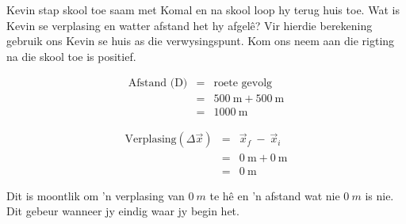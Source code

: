 Kevin stap skool toe saam met Komal en na skool loop hy terug huis toe. Wat is Kevin se verplasing en watter afstand het hy afgel\^e? Vir hierdie berekening gebruik ons Kevin se huis as die verwysingspunt. Kom ons neem aan die rigting na die skool toe is positief.\\
\begin{minipage}{0.5\textwidth}
\begin{eqnarray*}
\text{Afstand (D)} &=& \text{roete~gevolg}\\
&=&500\ \text{m} + 500\ \text{m}\\
&=&1000\ \text{m}
\end{eqnarray*}
\end{minipage}
\begin{minipage}{0.5\textwidth}
\begin{eqnarray*}
\text{Verplasing} (\Delta \vec{x}) &=& \vec{x}_f~ - ~ \vec{x}_i\\
&=&0\ \text{m} + 0\ \text{m}\\
&=&0\ \text{m}
\end{eqnarray*}
\end{minipage} 
\par
Dit is moontlik om  'n verplasing van $0~m$ te h\^e en  'n afstand wat nie $0~m$ is nie. Dit gebeur wanneer jy eindig waar jy begin het.

